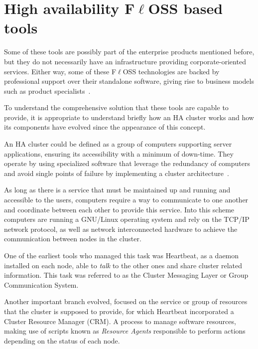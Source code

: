 \documentclass[a4paper, 12pt]{book}
\begin{document}
\section{High availability F$\ell$OSS based tools}
\label{sec:hafloss}


Some of these tools are possibly part of the enterprise products mentioned before, but they do not necessarily have an infrastructure providing corporate-oriented services. Either way, some of these F$\ell$OSS technologies are backed by professional support over their standalone software, giving rise to business models such as product specialists~\cite{Daffara1}.\bigskip

\noindent To understand the comprehensive solution that these tools are capable to provide, it is appropriate to understand briefly how an HA cluster works and how its components have evolved since the appearance of this concept.\bigskip

\noindent An HA cluster could be defined as a group of computers supporting server applications, ensuring its accessibility with a minimum of down-time. They operate by using specialized software that leverage the redundancy of computers and avoid single points of failure by implementing a cluster architecture~\cite{Weygant}.\bigskip

\noindent As long as there is a service that must be maintained up and running and accessible to the users, computers require a way to communicate to one another and coordinate between each other to provide this service. Into this scheme computers are running a GNU/Linux operating system and rely on the TCP/IP network protocol, as well as network interconnected hardware to achieve the communication between nodes in the cluster.\bigskip

\noindent One of the earliest tools who managed this task was Heartbeat, as a daemon installed on each node, able to \textit{talk} to the other ones and share cluster related information. This task was referred to as the Cluster Messaging Layer or Group Communication System.\bigskip

\noindent Another important branch evolved, focused on the service or group of resources that the cluster is supposed to provide, for which Heartbeat incorporated a Cluster Resource Manager (CRM). A process to manage software resources, making use of scripts known as \textit{Resource Agents} responsible to perform actions depending on the status of each node.\bigskip
\end{document}
